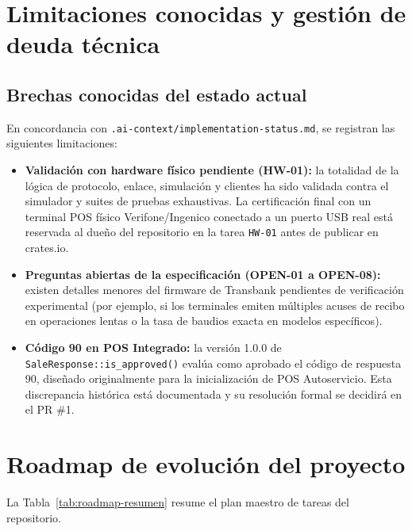 \documentclass{../../plantilla/raysac-informe}
\begin{document}
\clearpage
\section{Limitaciones conocidas y gestión de deuda técnica}

\subsection{Brechas conocidas del estado actual}
En concordancia con \texttt{.ai-context/implementation-status.md}, se registran las siguientes limitaciones:
\begin{itemize}
  \item \textbf{Validación con hardware físico pendiente (HW-01):} la totalidad de la lógica de protocolo,
    enlace, simulación y clientes ha sido validada contra el simulador y suites de pruebas exhaustivas. La
    certificación final con un terminal POS físico Verifone/Ingenico conectado a un puerto USB real está
    reservada al dueño del repositorio en la tarea \texttt{HW-01} antes de publicar en crates.io.
  \item \textbf{Preguntas abiertas de la especificación (OPEN-01 a OPEN-08):} existen detalles menores del
    firmware de Transbank pendientes de verificación experimental (por ejemplo, si los terminales emiten
    múltiples acuses de recibo en operaciones lentas o la tasa de baudios exacta en modelos específicos).
  \item \textbf{Código 90 en POS Integrado:} la versión 1.0.0 de \texttt{SaleResponse::is\_approved()}
    evalúa como aprobado el código de respuesta 90, diseñado originalmente para la inicialización de POS
    Autoservicio. Esta discrepancia histórica está documentada y su resolución formal se decidirá en el PR \#1.
\end{itemize}

\section{Roadmap de evolución del proyecto}

La Tabla~\ref{tab:roadmap-resumen} resume el plan maestro de tareas del repositorio.
\end{document}

